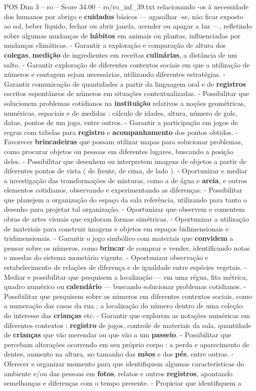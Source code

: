 \begin{textsample}{POS Dim 3 – ro – Score 34.00 – ro/ro\_inf\_39.txt}
relacionando -os à necessidade dos humanos por abrigo e \textbf{cuidados} básicos — agasalhar -se, não ficar exposto ao sol, beber líquido, fechar ou abrir janela, acender ou apagar a luz —, refletindo sobre algumas mudanças de \textbf{hábitos} em animais ou plantas, influenciadas por mudanças climáticas. - Garantir a exploração e comparação de altura dos \textbf{colegas}, \textbf{medição} de ingredientes em receitas \textbf{culinárias}, a distância de um salto. - Garantir exploração de diferentes contextos sociais em que a utilização de números e contagem sejam necessárias, utilizando diferentes estratégias. - Garantir comunicação de quantidades a partir da linguagem oral e de \textbf{registros} escritos espontâneos de números em situações contextualizadas. - Possibilitar que solucionem problemas cotidianos na \textbf{instituição} relativos a noções geométricas, numéricas, espaciais e de medidas : cálculo de idades, altura, número de gols, datas, pontos de um jogo, entre outros. - Garantir a participação em jogos de regras com tabelas para \textbf{registro} e \textbf{acompanhamento} dos pontos obtidos. - Favorecer \textbf{brincadeiras} que possam utilizar mapas para solucionar problemas, como procurar objetos ou pessoas em diferentes lugares, buscando a posição deles. - Possibilitar que desenhem ou interpretem imagens de objetos a partir de diferentes pontos de vista ( de frente, de cima, de lado ). - Oportunizar e mediar a investigação das transformações de misturas, como a de água e \textbf{areia}, e outros elementos cotidianos, observando e experimentando as diferenças. - Possibilitar que planejem a organização do espaço da sala referência, utilizando para tanto o desenho para projetar tal organização. - Oportunizar que observem e comentem obras de artes visuais que exploram formas simétricas. - Oportunizar a utilização de materiais para construir imagens e objetos em espaços bidimensionais e tridimensionais. - Garantir o jogo simbólico com materiais que \textbf{convidem} a pensar sobre os números, como \textbf{brincar} de comprar e vender, identificando notas e moedas do sistema monetário vigente. - Oportunizar observação e estabelecimento de relações de diferença e de igualdade entre espécies vegetais. - Mediar e possibilitar que pesquisem a localização — em uma régua, fita métrica, quadro numérico ou \textbf{calendário} — buscando solucionar problemas cotidianos. - Possibilitar que pesquisem sobre os números em diferentes contextos sociais, como a numeração das casas da rua ; a localização do número dentro de uma coleção do interesse das \textbf{crianças} etc. - Garantir que explorem as notações numéricas em diferentes contextos : \textbf{registro} de jogos, controle de materiais da sala, quantidade de \textbf{crianças} que vão merendar ou que vão a um \textbf{passeio}. - Possibilitar que percebam alterações ocorrendo em seu próprio corpo : a perda e aparecimento de dentes, aumento na altura, no tamanho das \textbf{mãos} e dos \textbf{pés}, entre outras. - Oferecer e organizar momento para que identifiquem algumas características do ambiente e/ou das pessoas em \textbf{fotos}, relatos e outros \textbf{registros}, apontando semelhanças e diferenças com o tempo presente. - Propiciar que identifiquem a 
\end{textsample}
